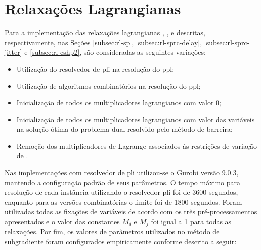 \begin{table}[!ht]
\centering
{}

\caption{Contagem de soluções dos modelos.}
\label{tab:sumario}
\end{table}

\section{Relaxações Lagrangianas} \label{sec:resultados-rls}

Para a  implementação das  relaxações lagrangianas {\rlu,  \rld, \rlt}  e {\rlq}
descritas,       respectivamente,      nas       Seções      \ref{subsec:rl-sp},
\ref{subsec:rl-sprc-delay}, \ref{subsec:rl-sprc-jitter} e \ref{subsec:rl-cshp2},
são consideradas as seguintes variações:

\begin{itemize}
\item Utilização do resolvedor de \gls{pli} na resolução do \gls{ppl};
\item Utilização de algoritmos combinatórios na resolução do \gls{ppl};
\item Inicialização de todos os multiplicadores lagrangianos com valor 0;
\item  Inicialização de  todos  os multiplicadores  lagrangianos  com valor  das
variáveis na solução ótima do problema dual resolvido pelo método de barreira;
\item  Remoção  dos multiplicadores  de  Lagrange  associados às  restrições  de
variação de {\delay}.
\end{itemize}

Nas  implementações com  resolvedor  de \gls{pli}  utilizou-se  o Gurobi  versão
9.0.3, mantendo  a configuração padrão de  seus parâmetros. O tempo  máximo para
resolução  de cada  instância  utilizando  o resolvedor  \gls{pli}  foi de  3600
segundos, enquanto para as versões combinatórias  o limite foi de 1800 segundos.
Foram  utilizadas  todas  as  fixações  de  variáveis  de  acordo  com  os  três
pré-processamentos apresentados e o valor das constantes $M_d$ e $M_j$ foi igual
a 1 para  todas as relaxações. Por  fim, os valores de  parâmetros utilizados no
método  de subgradiente  foram  configurados empiricamente  conforme descrito  a
seguir:

